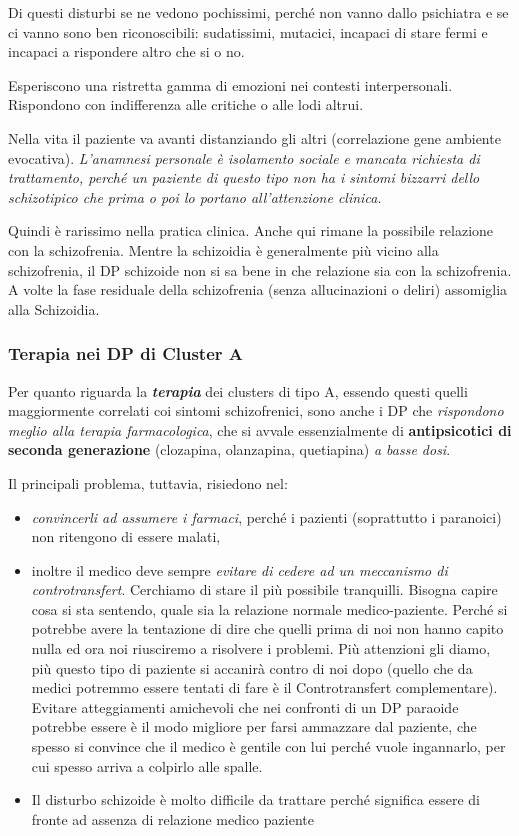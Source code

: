 Di questi disturbi se ne vedono pochissimi, perché non vanno dallo
psichiatra e se ci vanno sono ben riconoscibili: sudatissimi, mutacici,
incapaci di stare fermi e incapaci a rispondere altro che si o no.

Esperiscono una ristretta gamma di emozioni nei contesti interpersonali.
Rispondono con indifferenza alle critiche o alle lodi altrui.

Nella vita il paziente va avanti distanziando gli altri (correlazione
gene ambiente evocativa). \emph{\emph{L'anamnesi personale è isolamento
sociale e mancata richiesta di trattamento, perché un paziente di questo
tipo non ha i sintomi bizzarri dello schizotipico che prima o poi lo
portano all'attenzione clinica. }}

Quindi è rarissimo nella pratica clinica. Anche qui rimane la possibile
relazione con la schizofrenia. Mentre la schizoidia è generalmente più
vicino alla schizofrenia, il DP schizoide non si sa bene in che
relazione sia con la schizofrenia. A volte la fase residuale della
schizofrenia (senza allucinazioni o deliri) assomiglia alla Schizoidia.

\subsubsection{Terapia nei DP di Cluster A}

Per quanto riguarda la \textbf{\emph{terapia}} dei clusters di tipo A,
essendo questi quelli maggiormente correlati coi sintomi schizofrenici,
sono anche i DP che \emph{rispondono meglio alla terapia farmacologica},
che si avvale essenzialmente di \textbf{antipsicotici di seconda
generazione} (clozapina, olanzapina, quetiapina) \emph{a basse dosi}.

Il principali problema, tuttavia, risiedono nel:

\begin{itemize}
\item
  \emph{convincerli ad assumere i farmaci}, perché i pazienti
  (soprattutto i paranoici) non ritengono di essere malati,
\item
  inoltre il medico deve sempre \emph{evitare di cedere ad un meccanismo
  di controtransfert}. Cerchiamo di stare il più possibile tranquilli.
  Bisogna capire cosa si sta sentendo, quale sia la relazione normale
  medico-paziente. Perché si potrebbe avere la tentazione di dire che
  quelli prima di noi non hanno capito nulla ed ora noi riusciremo a
  risolvere i problemi. Più attenzioni gli diamo, più questo tipo di
  paziente si accanirà contro di noi dopo (quello che da medici potremmo
  essere tentati di fare è il Controtransfert complementare). Evitare
  atteggiamenti amichevoli che nei confronti di un DP paraoide potrebbe
  essere è il modo migliore per farsi ammazzare dal paziente, che spesso
  si convince che il medico è gentile con lui perché vuole ingannarlo,
  per cui spesso arriva a colpirlo alle spalle.
\item
  Il disturbo schizoide è molto difficile da trattare perché significa
  essere di fronte ad assenza di relazione medico paziente
\end{itemize}

